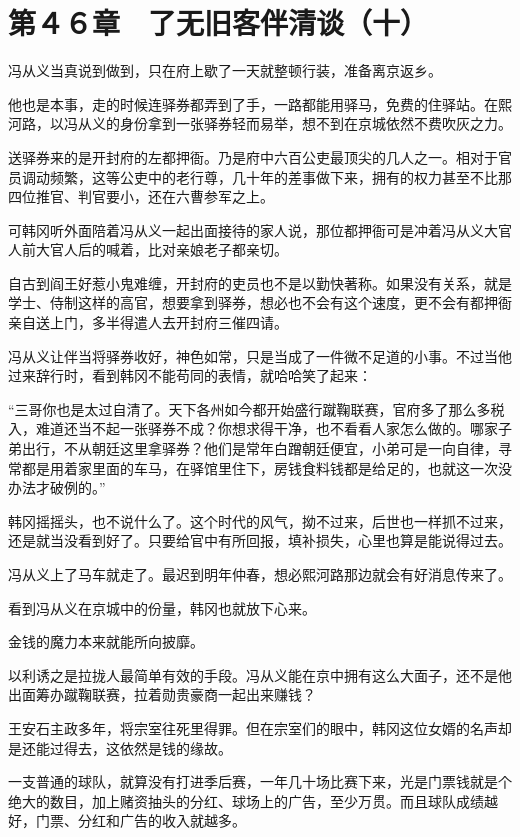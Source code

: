 \section{第４６章　了无旧客伴清谈（十）}

冯从义当真说到做到，只在府上歇了一天就整顿行装，准备离京返乡。

他也是本事，走的时候连驿券都弄到了手，一路都能用驿马，免费的住驿站。在熙河路，以冯从义的身份拿到一张驿券轻而易举，想不到在京城依然不费吹灰之力。

送驿券来的是开封府的左都押衙。乃是府中六百公吏最顶尖的几人之一。相对于官员调动频繁，这等公吏中的老行尊，几十年的差事做下来，拥有的权力甚至不比那四位推官、判官要小，还在六曹参军之上。

可韩冈听外面陪着冯从义一起出面接待的家人说，那位都押衙可是冲着冯从义大官人前大官人后的喊着，比对亲娘老子都亲切。

自古到阎王好惹小鬼难缠，开封府的吏员也不是以勤快著称。如果没有关系，就是学士、侍制这样的高官，想要拿到驿券，想必也不会有这个速度，更不会有都押衙亲自送上门，多半得遣人去开封府三催四请。

冯从义让伴当将驿券收好，神色如常，只是当成了一件微不足道的小事。不过当他过来辞行时，看到韩冈不能苟同的表情，就哈哈笑了起来：

“三哥你也是太过自清了。天下各州如今都开始盛行蹴鞠联赛，官府多了那么多税入，难道还当不起一张驿券不成？你想求得干净，也不看看人家怎么做的。哪家子弟出行，不从朝廷这里拿驿券？他们是常年白蹭朝廷便宜，小弟可是一向自律，寻常都是用着家里面的车马，在驿馆里住下，房钱食料钱都是给足的，也就这一次没办法才破例的。”

韩冈摇摇头，也不说什么了。这个时代的风气，拗不过来，后世也一样抓不过来，还是就当没看到好了。只要给官中有所回报，填补损失，心里也算是能说得过去。

冯从义上了马车就走了。最迟到明年仲春，想必熙河路那边就会有好消息传来了。

看到冯从义在京城中的份量，韩冈也就放下心来。

金钱的魔力本来就能所向披靡。

以利诱之是拉拢人最简单有效的手段。冯从义能在京中拥有这么大面子，还不是他出面筹办蹴鞠联赛，拉着勋贵豪商一起出来赚钱？

王安石主政多年，将宗室往死里得罪。但在宗室们的眼中，韩冈这位女婿的名声却是还能过得去，这依然是钱的缘故。

一支普通的球队，就算没有打进季后赛，一年几十场比赛下来，光是门票钱就是个绝大的数目，加上赌资抽头的分红、球场上的广告，至少万贯。而且球队成绩越好，门票、分红和广告的收入就越多。

